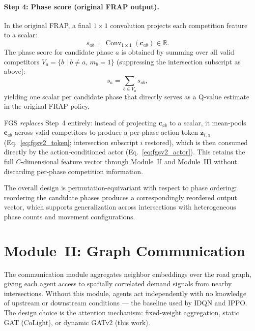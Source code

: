 \paragraph{Step 4: Phase score (original FRAP output).}
In the original FRAP, a final $1{\times}1$ convolution projects each competition feature to a scalar:
\begin{equation}
  s_{ab} = \operatorname{Conv}_{1\times1}(\mathbf{c}_{ab}) \in \mathbb{R}.
  \label{eq:frap_scalar}
\end{equation}
The phase score for candidate phase $a$ is obtained by summing over all valid competitors $V_a = \{b \mid b\ne a,\, m_b=1\}$ (suppressing the intersection subscript as above):
\begin{equation}
  s_a = \sum_{b \in V_a} s_{ab},
  \label{eq:frap_score}
\end{equation}
yielding one scalar per candidate phase that directly serves as a Q-value estimate in the original FRAP policy.

FGS \emph{replaces} Step~4 entirely: instead of projecting $\mathbf{c}_{ab}$ to a scalar, it mean-pools $\mathbf{c}_{ab}$ across valid competitors to produce a per-phase action token $\mathbf{z}_{i,a}$ (Eq.~\ref{eq:fgsv2_token}; intersection subscript $i$ restored), which is then consumed directly by the action-conditioned actor (Eq.~\ref{eq:fgsv2_actor}). This retains the full $C$-dimensional feature vector through Module~II and Module~III without discarding per-phase competition information.

The overall design is permutation-equivariant with respect to phase ordering: reordering the candidate phases produces a correspondingly reordered output vector, which supports generalization across intersections with heterogeneous phase counts and movement configurations.

\section{Module~II: Graph Communication}
\label{sec:Methodology_Communication}

The communication module aggregates neighbor embeddings over the road graph, giving each agent access to spatially correlated demand signals from nearby intersections. Without this module, agents act independently with no knowledge of upstream or downstream conditions — the baseline used by IDQN and IPPO. The design choice is the attention mechanism: fixed-weight aggregation, static GAT (CoLight), or dynamic GATv2 (this work).

